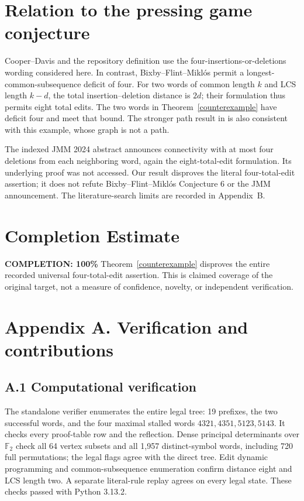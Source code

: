 \documentclass[11pt]{article}
\begin{document}
\section{Relation to the pressing game conjecture}
Cooper--Davis \cite[Conjecture 1]{cooper} and the repository definition
use the four-insertions-or-deletions wording considered here. In contrast,
Bixby--Flint--Mikl\'os \cite[Conjecture 6]{bixby} permit a
longest-common-subsequence deficit of four. For two words of common
length $k$ and LCS length $k-d$, the total insertion--deletion distance
is $2d$; their formulation thus permits eight total edits. The two words
in Theorem~\ref{counterexample} have deficit four and meet that bound.
The stronger path result in \cite[Theorem 7]{bixby} is also consistent
with this example, whose graph is not a path.

The indexed JMM 2024 abstract \cite{jmm} announces connectivity with
at most four deletions from each neighboring word, again the
eight-total-edit formulation. Its underlying proof was not accessed.
Our result disproves the literal four-total-edit assertion; it does not
refute Bixby--Flint--Mikl\'os Conjecture 6 or the JMM announcement.
The literature-search limits are recorded in Appendix~B.

\section{Completion Estimate}
\noindent\textbf{COMPLETION: 100\%}
Theorem~\ref{counterexample} disproves the entire recorded universal
four-total-edit assertion. This is claimed coverage of the original
target, not a measure of confidence, novelty, or independent verification.

\section*{Appendix A. Verification and contributions}
\subsection*{A.1 Computational verification}
The standalone verifier enumerates the entire legal tree: 19 prefixes,
the two successful words, and the four maximal stalled words
$4321,4351,5123,5143$. It checks every proof-table row and the reflection.
Dense principal determinants over $\mathbb F_2$ check all 64 vertex
subsets and all 1,957 distinct-symbol words, including 720 full
permutations; the legal flags agree with the direct tree.
Edit dynamic programming and common-subsequence enumeration confirm
distance eight and LCS length two. A separate literal-rule replay
agrees on every legal state. These checks passed with Python 3.13.2.
\end{document}
